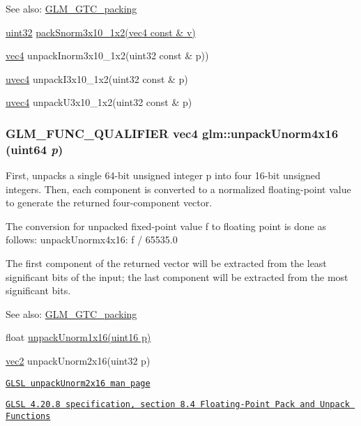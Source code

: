 \begin{Desc}
\item[See also:]\hyperlink{group__gtc__packing}{GLM\_\-GTC\_\-packing} 

\hyperlink{group__gtc__type__precision_g202b6a53c105fcb7e531f9b443518451}{uint32} \hyperlink{group__gtc__packing_g0d4157cec37c0312216a7be1cc92df54}{packSnorm3x10\_\-1x2(vec4 const \& v)} 

\hyperlink{group__core__types_g5881b1b022d7fd1b7218f5916532dd02}{vec4} unpackInorm3x10\_\-1x2(uint32 const \& p)) 

\hyperlink{group__core__types_g1c426d19627b32b14f0089f7f4ba7b1d}{uvec4} unpackI3x10\_\-1x2(uint32 const \& p) 

\hyperlink{group__core__types_g1c426d19627b32b14f0089f7f4ba7b1d}{uvec4} unpackU3x10\_\-1x2(uint32 const \& p) \end{Desc}
\hypertarget{group__gtc__packing_gfb2b502bc406031a5618ce930139a9e3}{
\subsubsection[unpackUnorm4x16]{\setlength{\rightskip}{0pt plus 5cm}GLM\_\-FUNC\_\-QUALIFIER vec4 glm::unpackUnorm4x16 (uint64 {\em p})}}
\label{group__gtc__packing_gfb2b502bc406031a5618ce930139a9e3}


First, unpacks a single 64-bit unsigned integer p into four 16-bit unsigned integers. Then, each component is converted to a normalized floating-point value to generate the returned four-component vector.

The conversion for unpacked fixed-point value f to floating point is done as follows: unpackUnormx4x16: f / 65535.0

The first component of the returned vector will be extracted from the least significant bits of the input; the last component will be extracted from the most significant bits.

\begin{Desc}
\item[See also:]\hyperlink{group__gtc__packing}{GLM\_\-GTC\_\-packing} 

float \hyperlink{group__gtc__packing_g7770e3ade4f4764cc1b2eb42ac4ec188}{unpackUnorm1x16(uint16 p)} 

\hyperlink{group__core__types_ga1618f51db67eaa145db101d8c8431d8}{vec2} unpackUnorm2x16(uint32 p) 

\href{http://www.opengl.org/sdk/docs/manglsl/xhtml/unpackUnorm2x16.xml}{\tt GLSL unpackUnorm2x16 man page} 

\href{http://www.opengl.org/registry/doc/GLSLangSpec.4.20.8.pdf}{\tt GLSL 4.20.8 specification, section 8.4 Floating-Point Pack and Unpack Functions} \end{Desc}
